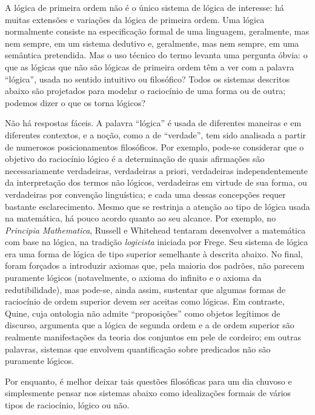 \documentclass[../../../include/open-logic-section]{subfiles}
\begin{document}


A lógica de primeira ordem não é o único sistema de lógica de interesse:
há muitas extensões e variações da lógica de primeira ordem. Uma lógica
normalmente consiste na especificação formal de uma linguagem, geralmente,
mas nem sempre, em um sistema dedutivo e, geralmente, mas nem sempre, em
uma semântica pretendida. Mas o uso técnico do termo levanta uma
pergunta óbvia: o que as lógicas que não são lógicas de primeira ordem têm
a ver com a palavra ``lógica'', usada no sentido intuitivo ou filosófico?
Todos os sistemas descritos abaixo são projetados para modelar o
raciocínio de uma forma ou de outra; podemos dizer o que os torna lógicos?

Não há respostas fáceis. A palavra ``lógica'' é usada de
diferentes maneiras e em diferentes contextos, e a noção, como a de
``verdade'', tem sido analisada a partir de numerosos posicionamentos
filosóficos. Por exemplo, pode-se considerar que o objetivo do raciocínio
lógico é a determinação de quais afirmações são necessariamente verdadeiras,
verdadeiras a priori, verdadeiras independentemente da interpretação dos
termos não lógicos, verdadeiras em virtude de sua forma, ou verdadeiras por
convenção linguística; e cada uma dessas concepções requer bastante
esclarecimento. Mesmo que se restrinja a atenção ao tipo de lógica usada na
matemática, há pouco acordo quanto ao seu alcance. Por exemplo, no
\textit{Principia Mathematica}, Russell e Whitehead tentaram desenvolver
a matemática com base na lógica, na tradição {\em logicista}
iniciada por Frege. Seu sistema de lógica era uma forma de lógica de tipo
superior semelhante à descrita abaixo. No final, foram forçados a
introduzir axiomas que, pela maioria dos padrões, não parecem puramente
lógicos (notavelmente, o axioma do infinito e o axioma da redutibilidade),
mas pode-se, ainda assim, sustentar que algumas formas de raciocínio de
ordem superior devem ser aceitas como lógicas. Em contraste, Quine, cuja
ontologia não admite ``proposições'' como objetos legítimos de discurso,
argumenta que a lógica de segunda ordem e a de ordem superior são realmente
manifestações da teoria dos conjuntos em pele de cordeiro; em outras
palavras, sistemas que envolvem quantificação sobre predicados não são
puramente lógicos.

Por enquanto, é melhor deixar tais questões filosóficas para um dia
chuvoso e simplesmente pensar nos sistemas abaixo como idealizações formais
de vários tipos de raciocínio, lógico ou não.
\end{document}
